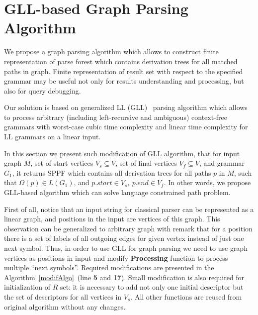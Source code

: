\section{GLL-based Graph Parsing Algorithm}

We propose a graph parsing algorithm which allows to construct finite representation of parse forest which contains derivation trees for all matched paths in graph.
Finite representation of result set with respect to the specified grammar may be useful not only for results understanding and processing, but also for query debugging. 

Our solution is based on generalized LL (GLL)~\cite{scott2010gll,FastPracticalGLL} parsing algorithm which allows to process arbitrary (including left-recursive and ambiguous) context-free grammars with worst-case cubic time complexity and linear time complexity for LL grammars on a linear input. 

In this section we present such modification of GLL algorithm, that for input graph $M$, set of start vertices $V_s\subseteq V$, set of final vertices $V_f\subseteq V$, and grammar $G_1$, it returns SPPF which contains all derivation trees for all paths $p$ in $M$, such that $\Omega(p) \in L(G_1)$, and $p.start \in V_s,\ p.end \in V_f$.
In other words, we propose GLL-based algorithm which can solve language constrained path problem.

First of all, notice that an input string for classical parser can be represented as a linear graph, and positions in the input are vertices of this graph.
This observation can be generalized to arbitrary graph with remark that for a position there is a set of labels of all outgoing edges for given vertex instead of just one next symbol. 
Thus, in order to use GLL for graph parsing we need to use graph vertices as positions in input and modify \textbf{Processing} function to process multiple ``next symbols''.
Required modifications are presented in the Algorithm~\ref{modifAlgo}~(line \textbf{5} and \textbf{17}).
Small modification is also required for initialization of $R$ set: it is necessary to add not only one initial descriptor but the set of descriptors for all vertices in $V_s$.
All other functions are reused from original algorithm without any changes.

